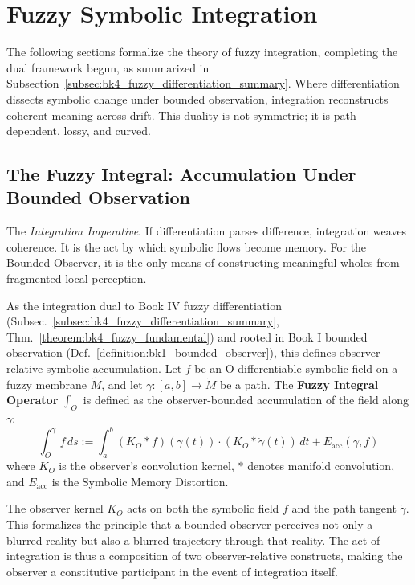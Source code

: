 \section{Fuzzy Symbolic Integration}
\label{sec:bk4_fuzzy_symbolic_integration}

The following sections formalize the theory of fuzzy integration, completing the dual framework begun, as summarized in Subsection~\ref{subsec:bk4_fuzzy_differentiation_summary}. Where differentiation dissects symbolic change under bounded observation, integration reconstructs coherent meaning across drift. This duality is not symmetric; it is path-dependent, lossy, and curved.

\subsection{The Fuzzy Integral: Accumulation Under Bounded Observation}
\label{subsec:bk4_fuzzy_integral_operator}

The \emph{Integration Imperative}. If differentiation parses difference, integration weaves coherence. It is the act by which symbolic flows become memory. For the Bounded Observer, it is the only means of constructing meaningful wholes from fragmented local perception.

\begin{definition}
\label{definition:bk4_fuzzy_integral_operator}
As the integration dual to Book IV fuzzy differentiation (Subsec.~\ref{subsec:bk4_fuzzy_differentiation_summary}, Thm.~\ref{theorem:bk4_fuzzy_fundamental}) and rooted in Book I bounded observation (Def.~\ref{definition:bk1_bounded_observer}), this defines observer-relative symbolic accumulation.
Let $f$ be an O-differentiable symbolic field on a fuzzy membrane $\tilde{M}$, and let $\gamma: [a, b] \to \tilde{M}$ be a path. The \textbf{Fuzzy Integral Operator} $\int_O$ is defined as the observer-bounded accumulation of the field along $\gamma$:
\[
\int_O^\gamma f \, ds := \int_a^b (K_O * f)(\gamma(t)) \cdot (K_O * \dot{\gamma}(t)) \, dt + E_{\text{acc}}(\gamma, f)
\]
where $K_O$ is the observer's convolution kernel, $*$ denotes manifold convolution, and $E_{\text{acc}}$ is the Symbolic Memory Distortion.
\end{definition}

\begin{remark}
    The observer kernel $K_O$ acts on both the symbolic field $f$ and the path tangent $\dot{\gamma}$. This formalizes the principle that a bounded observer perceives not only a blurred reality but also a blurred trajectory through that reality. The act of integration is thus a composition of two observer-relative constructs, making the observer a constitutive participant in the event of integration itself.
\end{remark}

